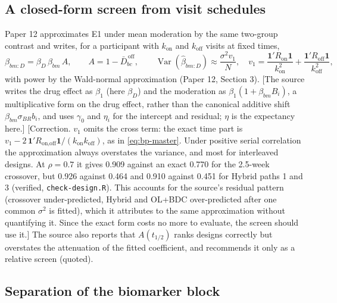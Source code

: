 \documentclass[11pt]{article}
\newcommand{\note}[1]{\textcolor{blue!60!black}{\small [#1]}}
\newcommand{\code}[1]{\texttt{#1}}
\begin{document}
\subsection{A closed-form screen from visit schedules}

Paper 12 approximates E1 under mean moderation by the same two-group
contrast and writes, for a participant with $k_{\text{on}}$ and
$k_{\text{off}}$ visits at fixed times,
\begin{equation}
\beta_{bm:D} = \beta_D\,\beta_{bm}\,A, \qquad A = 1 - \bar D^{\,\text{off}}_{bc},
\qquad
\operatorname{Var}(\hat\beta_{bm:D}) \approx \frac{\sigma^2 v_1}{N},
\quad
v_1 = \frac{\mathbf 1'R_{\text{on}}\mathbf 1}{k_{\text{on}}^2}
  + \frac{\mathbf 1'R_{\text{off}}\mathbf 1}{k_{\text{off}}^2},
\label{eq:bp-paper12}
\end{equation}
with power by the Wald-normal approximation (Paper 12, Section 3).
\note{The source writes the drug effect as $\beta_1$ (here $\beta_D$)
and the moderation as $\beta_1(1 + \beta_{bm}B_i)$,
a multiplicative form on the drug effect, rather than the canonical
additive shift $\beta_{bm}\sigma_{BR}b_i$, and uses $\gamma_0$ and
$\eta_i$ for the intercept and residual; $\eta$ is the expectancy here.}
\note{Correction. $v_1$ omits the cross term: the exact time part is
$v_1 - 2\,\mathbf 1'R_{\text{on,off}}\mathbf 1/(k_{\text{on}}
k_{\text{off}})$, as in \eqref{eq:bp-master}. Under positive serial
correlation the approximation always overstates the variance, and most
for interleaved designs. At $\rho = 0.7$ it gives 0.909 against an
exact 0.770 for the 2.5-week crossover, but 0.926 against 0.464 and
0.910 against 0.451 for Hybrid paths 1 and 3 (verified,
\code{check-design.R}). This accounts for the source's residual
pattern (crossover under-predicted, Hybrid and OL+BDC over-predicted
after one common $\sigma^2$ is fitted), which it attributes to the same
approximation without quantifying it. Since the exact form costs no
more to evaluate, the screen should use it.} The source also reports
that $A(t_{1/2})$ ranks designs correctly but overstates the attenuation
of the fitted coefficient, and recommends it only as a relative screen
(quoted).

\subsection{Separation of the biomarker block}
\label{sec:bp-sep}
\end{document}
